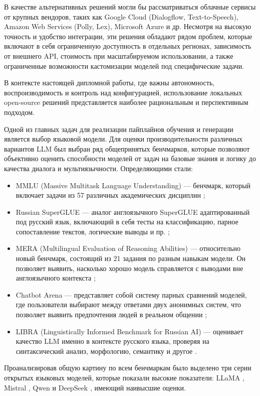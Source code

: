 В качестве альтернативных решений могли бы рассматриваться
облачные сервисы от крупных вендоров, таких как Google Cloud (Dialogflow, Text-to-Speech),
Amazon Web Services (Polly, Lex), Microsoft Azure и др.
Несмотря на высокую точность и удобство интеграции,
эти решения обладают рядом проблем, которые включают в себя ограниченную доступность в отдельных регионах,
зависимость от внешнего API, стоимость при масштабируемом использовании,
а также ограниченные возможности кастомизации моделей под специфические задачи.

В контексте настоящей дипломной работы,
где важны автономность, воспроизводимость и контроль над конфигурацией,
использование локальных open-source решений
представляется наиболее рациональным и перспективным подходом.

Одной из главных задач для реализации пайплайнов обучения и генерации является выбор языковой модели. Для оценки производительности различных вариантов LLM был выбран ряд общепринятых бенчмарков, которые позволяют объективно оценить способности моделей от задач на базовые знания и логику до качества диалога и мультиязычности. Определяющими стали:
\begin{itemize}
    \item MMLU (Massive Multitask Language Understanding) — бенчмарк, который включает задачи из 57 различных академических дисциплин \cite{Wang2024MMLUPro};
    \item Russian SuperGLUE — аналог англоязычного SuperGLUE адаптированный под русский язык, включающий в себя тесты на классификацию, парное сопоставление текстов, логические выводы и пр. \cite{Fenogenova2022RussianSuperGLUE};
    \item MERA (Multilingual Evaluation of Reasoning Abilities) — относительно новый бенчмарк, состоящий из 21 задания по разным навыкам модели. Он позволяет выявить, насколько хорошо модель справляется с выводами вне англоязычного контекста \cite{Fenogenova2024MERA};
    \item Chatbot Arena — представляет собой систему парных сравнений моделей, где пользователи выбирают между ответами двух анонимных систем, что позволяет выявить предпочтения людей в реальном общении \cite{Chiang2024ChatbotArena};
    \item LIBRA (Linguistically Informed Benchmark for Russian AI)  — оценивает качество LLM именно в контексте русского языка, проверяя на синтаксический анализ, морфологию, семантику и другое \cite{Xu2024Libra}.
\end{itemize}
Проанализировав общую картину по всем бенчмаркам было выделено три серии открытых языковых моделей, которые показали высокие показатели: LLaMA \cite{Grattafiori2024Llama3}, Mistral \cite{Jiang2023Mistral7B}, Qwen \cite{Yang2025Qwen3} и DeepSeek \cite{DeepSeekAI2025DeepSeekV3}, имеющий наивысшие оценки.
